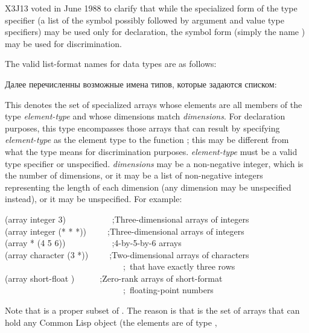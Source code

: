 \begin{new}
X3J13 voted in June 1988  to clarify that
while the specialized form of the  type specifier
(a list of the symbol  possibly followed by
argument and value type specifiers)
may be used only for declaration, the symbol form (simply the name
) may be used for discrimination.
\end{new}

The valid list-format names for data types are as follows:

Далее перечисленны возможные имена типов, которые задаются списком:

\begin{flushdesc}
\item[\cd{(array \emph{element-type} \emph{dimensions})}]
This denotes the set
of specialized arrays
whose elements are all members of the type \emph{element-type}
and whose dimensions match \emph{dimensions}.
For declaration purposes, this type encompasses those arrays
that can result by specifying \emph{element-type} as the element type
to the function ; this may be different
from what the type means for discrimination purposes.
\emph{element-type} must be a valid type specifier or unspecified.
\emph{dimensions} may be a non-negative integer, which is the number
of dimensions, or it may be a list of non-negative integers
representing the length of each dimension (any dimension
may be unspecified instead), or it may be unspecified.
For example:
\begin{lisp}
(array integer 3)~~~~~~~~~~~;\textrm{Three-dimensional arrays of integers} \\
(array integer (* * *))~~~~~;\textrm{Three-dimensional arrays of integers} \\
(array * (4 5 6))~~~~~~~~~~~;\textrm{4-by-5-by-6 arrays} \\
(array character (3 *))~~~~~;\textrm{Two-dimensional arrays of characters} \\
~~~~~~~~~~~~~~~~~~~~~~~~~~~~;~\textrm{that have exactly three rows} \\
(array short-float {\emptylist})~~~~~~;\textrm{Zero-rank arrays of short-format} \\
~~~~~~~~~~~~~~~~~~~~~~~~~~~~;~\textrm{floating-point numbers}
\end{lisp}
Note that  is a proper subset of .
The reason is that  is the set of arrays that can
hold any Common Lisp object (the elements are of type ,

\end{flushdesc}
